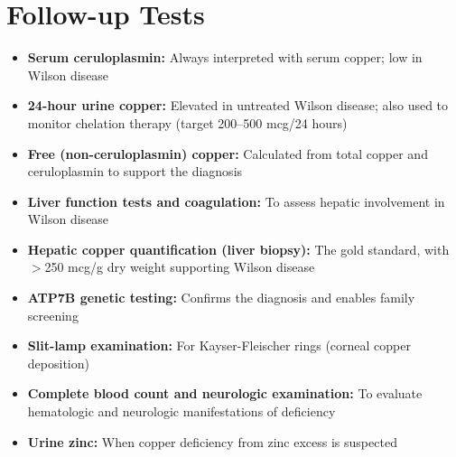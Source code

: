 \section*{Follow-up Tests}
\begin{itemize}
  \item \textbf{Serum ceruloplasmin:} Always interpreted with serum copper; low in Wilson disease
  \item \textbf{24-hour urine copper:} Elevated in untreated Wilson disease; also used to monitor chelation therapy (target 200--500 mcg/24 hours)
  \item \textbf{Free (non-ceruloplasmin) copper:} Calculated from total copper and ceruloplasmin to support the diagnosis
  \item \textbf{Liver function tests and coagulation:} To assess hepatic involvement in Wilson disease
  \item \textbf{Hepatic copper quantification (liver biopsy):} The gold standard, with $>$250 mcg/g dry weight supporting Wilson disease
  \item \textbf{ATP7B genetic testing:} Confirms the diagnosis and enables family screening
  \item \textbf{Slit-lamp examination:} For Kayser-Fleischer rings (corneal copper deposition)
  \item \textbf{Complete blood count and neurologic examination:} To evaluate hematologic and neurologic manifestations of deficiency
  \item \textbf{Urine zinc:} When copper deficiency from zinc excess is suspected
\end{itemize}

